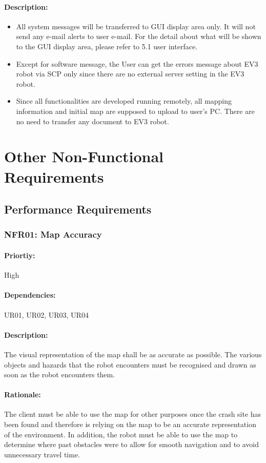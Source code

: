 \documentclass[10pt,a4paper,titlepage]{article}
\begin{document}
	\paragraph{Description:}
	\begin{itemize}
		\item All system messages will be transferred to GUI display area only. It will not send any e-mail alerts to user e-mail. For the detail about what will be shown to the GUI display area, please refer to 5.1 user interface.
		\item Except for software message, the User can get the errors message about EV3 robot via SCP only since there are no external server setting in the EV3 robot.
		\item Since all functionalities are developed running remotely, all mapping information and initial map are supposed to upload to user’s PC. There are no need to transfer any document to EV3 robot.
	\end{itemize}
	\newpage
	\section{Other Non-Functional Requirements}
	
	\subsection{Performance Requirements}
	\subsubsection*{NFR01: Map Accuracy}
	\paragraph{Priortiy:} High
	\paragraph{Dependencies:} UR01, UR02, UR03, UR04
	\paragraph{Description:} The visual representation of the map shall be as accurate as possible. The various objects and hazards that the robot encounters must be recognised and drawn as soon as the robot encounters them.
	\paragraph{Rationale:} The client must be able to use the map for other purposes once the crash site has been found and therefore is relying on the map to be an accurate representation of the environment. In addition, the robot must be able to use the map to determine where past obstacles were to allow for smooth navigation and to avoid unnecessary travel time.\\
	
\end{document}
